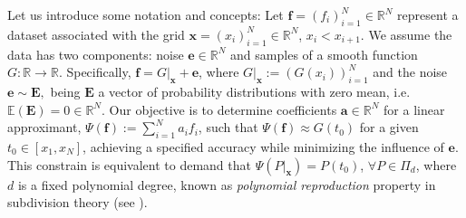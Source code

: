 \documentclass[preprint]{elsarticle}       %
\newcommand{\R}{\mathds{R}}
\newcommand{\lra}{\longrightarrow}
\newcommand{\ba}{\bm{a}}
\newcommand{\bE}{\bm{E}}
\newcommand{\be}{\bm{e}}
\newcommand{\bff}{\bm{f}}
\newcommand{\bx}{\bm{x}}
\newcommand{\mean}[1]{\mathbb{E}\left(#1\right)}
\theoremstyle{plain}
\theoremstyle{remark}
\begin{document}


Let us introduce some notation and concepts: Let $\bff = (f_i)_{i=1}^{N} \in\R^N$ represent a dataset associated with the grid $\bx=(x_i)_{i=1}^{N} \in \R^N$, $x_i < x_{i+1}$. We assume the data has two components: %
noise $\be\in\R^N$ and samples of a smooth function $G:\R \lra \R$. Specifically, $\bff = G|_{\bx}+\be$, where $G|_{\bx} := (G(x_i))_{i=1}^{N}$ and the noise $\be \sim \bE,$ being $\bE$ a vector of probability distributions with zero mean, i.e. $\mean{\bE} = 0\in\R^N.$ Our objective is to determine coefficients $\ba\in\R^N$ for a linear approximant, $\Psi(\bff) := \sum_{i=1}^{N} a_i f_{i}$, such that $\Psi(\bff)\approx G(t_0)$ for a given $t_0\in[x_1,x_N]$, achieving a specified accuracy while minimizing the influence of $\be$. This constrain is equivalent to demand that $\Psi (P|_{\bx}) = P(t_0)$, $\forall P\in\Pi_d$, where $d$ is a fixed polynomial degree, known as \emph{polynomial reproduction} property in subdivision theory (see \cite{Lopez24,dynlevinluzzato}).


\end{document}
